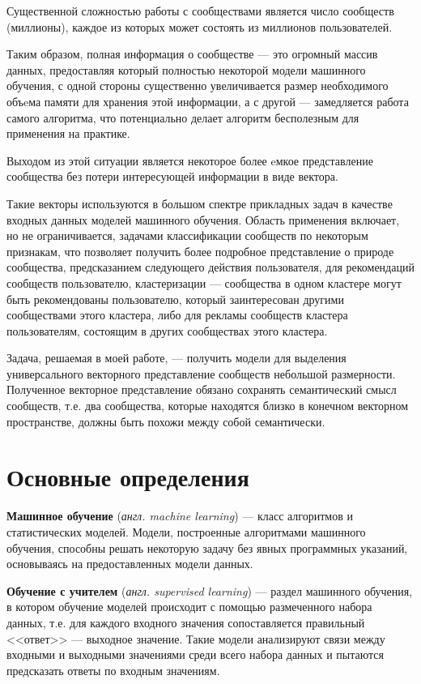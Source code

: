 \documentclass[times,specification,annotation]{itmo-student-thesis}
\begin{document}
Существенной сложностью работы с сообществами является число сообществ (миллионы), каждое из которых может состоять из миллионов пользователей.  

Таким образом, полная информация о сообществе --- это огромный массив
данных, предоставляя который полностью некоторой модели машинного обучения,
с одной стороны существенно увеличивается размер необходимого объeма памяти для хранения этой информации, а с другой --- замедляется работа самого алгоритма, что потенциально делает алгоритм бесполезным для применения на практике.

Выходом из этой ситуации является некоторое более eмкое представление сообщества без потери интересующей информации в виде вектора.

Такие векторы используются в большом спектре прикладных задач в качестве входных данных моделей машинного обучения. Область применения включает, но не ограничивается, задачами классификации сообществ по некоторым признакам, что позволяет получить более подробное представление о природе сообщества, предсказанием следующего действия пользователя, для рекомендаций сообществ пользователю, кластеризации --- сообщества в одном кластере могут быть рекомендованы пользователю, который заинтересован другими сообществами этого кластера, либо для рекламы сообществ кластера пользователям, состоящим в других сообществах этого кластера. 

Задача, решаемая в моей работе, --- получить модели для выделения универсального векторного представление сообществ небольшой размерности. Полученное векторное представление обязано сохранять семантический смысл сообществ, т.е. два сообщества, которые находятся близко в конечном векторном пространстве, должны быть похожи между собой семантически. 

\section{Основные определения}\label{sec:def}

\textbf{Машинное обучение} (\textit{англ. machine learning}) --- класс алгоритмов и статистических моделей. Модели, построенные алгоритмами машинного обучения, способны решать некоторую задачу без явных программных указаний, основываясь на предоставленных модели данных.   

\textbf{Обучение с учителем} (\textit{англ. supervised learning}) --- раздел машинного обучения, в котором обучение моделей происходит с помощью размеченного набора данных, т.е. для каждого входного значения сопоставляется правильный <<ответ>> --- выходное значение. Такие модели анализируют связи между входными и выходными значениями среди всего набора данных и пытаются предсказать ответы по входным значениям. 
\end{document}
